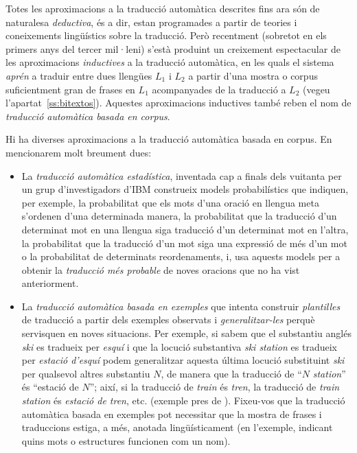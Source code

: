 \label{ss:induc}

Totes les aproximacions a la traducció automàtica descrites fins ara
són de naturalesa \emph{deductiva}, és a dir, estan programades a
partir de teories i coneixements lingüístics sobre la traducció. Però
recentment (sobretot en els primers anys del tercer mil·leni) s'està
produint un creixement espectacular de les aproximacions
\emph{inductives} a la traducció automàtica, en les quals el sistema
\emph{aprén} a traduir entre dues llengües $L_1$ i $L_2$ a partir
d'una mostra o corpus suficientment gran de frases en $L_1$
acompanyades de la traducció a $L_2$ (vegeu
l'apartat~\ref{ss:bitextos}). Aquestes aproximacions inductives també
reben el nom de \emph{traducció automàtica basada en corpus}.

Hi ha diverses aproximacions a la traducció automàtica basada en
corpus. En mencionarem molt breument dues:
\begin{itemize}
\item La \emph{traducció automàtica estadística},
inventada cap a finals dels vuitanta per un grup d'investigadors d'IBM
\citep{brown90j} construeix models probabilístics que indiquen, per
exemple, la probabilitat que els mots d'una oració en llengua meta
s'ordenen d'una determinada manera, la probabilitat que la traducció
d'un determinat mot en una llengua siga traducció d'un determinat mot
en l'altra, la probabilitat que la traducció d'un mot siga una
expressió de més d'un mot o la probabilitat de determinats
reordenaments, i, usa aquests models per a obtenir la \emph{traducció
  més probable} de noves oracions que no ha vist anteriorment. 
\item La \emph{traducció automàtica basada en exemples} que intenta
construir \emph{plantilles} de traducció a partir dels exemples
observats i \emph{generalitzar-les} perquè servisquen en noves
situacions. Per exemple, si sabem que el substantiu anglés \emph{ski}
es tradueix per \emph{esquí} i que la locució substantiva \emph{ski
  station} es tradueix per \emph{estació d'esquí} podem generalitzar
aquesta última locució substituint \emph{ski} per qualsevol altres
substantiu $N$, de manera que la traducció de ``$N$ \emph{station}''
és ``estació de $N$''; així, si la traducció de \emph{train} és
\emph{tren}, la traducció de \emph{train station} és \emph{estació de
  tren}, etc. (exemple pres de \citealt{carl01j}). Fixeu-vos que la traducció automàtica basada en exemples
pot necessitar que la mostra de frases i traduccions estiga, a més,
anotada lingüísticament (en l'exemple, indicant quins mots o
estructures funcionen com un nom).
\end{itemize}
